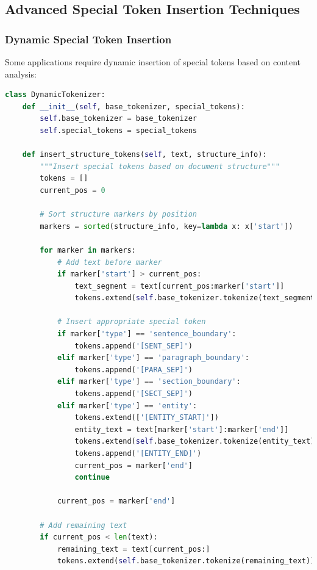 \subsection{Advanced Special Token Insertion Techniques}

\subsubsection{Dynamic Special Token Insertion}

Some applications require dynamic insertion of special tokens based on content analysis:

\begin{lstlisting}[language=Python, caption=Dynamic special token insertion]
class DynamicTokenizer:
    def __init__(self, base_tokenizer, special_tokens):
        self.base_tokenizer = base_tokenizer
        self.special_tokens = special_tokens
        
    def insert_structure_tokens(self, text, structure_info):
        """Insert special tokens based on document structure"""
        tokens = []
        current_pos = 0
        
        # Sort structure markers by position
        markers = sorted(structure_info, key=lambda x: x['start'])
        
        for marker in markers:
            # Add text before marker
            if marker['start'] > current_pos:
                text_segment = text[current_pos:marker['start']]
                tokens.extend(self.base_tokenizer.tokenize(text_segment))
            
            # Insert appropriate special token
            if marker['type'] == 'sentence_boundary':
                tokens.append('[SENT_SEP]')
            elif marker['type'] == 'paragraph_boundary':
                tokens.append('[PARA_SEP]')
            elif marker['type'] == 'section_boundary':
                tokens.append('[SECT_SEP]')
            elif marker['type'] == 'entity':
                tokens.extend(['[ENTITY_START]'])
                entity_text = text[marker['start']:marker['end']]
                tokens.extend(self.base_tokenizer.tokenize(entity_text))
                tokens.append('[ENTITY_END]')
                current_pos = marker['end']
                continue
                
            current_pos = marker['end']
        
        # Add remaining text
        if current_pos < len(text):
            remaining_text = text[current_pos:]
            tokens.extend(self.base_tokenizer.tokenize(remaining_text))
            

\end{lstlisting}
